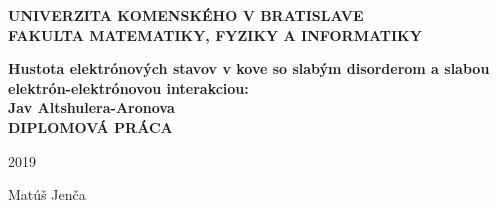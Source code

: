 \thispagestyle{empty}
\begin{center}
{\large \bf UNIVERZITA KOMENSKÉHO V BRATISLAVE \\
FAKULTA MATEMATIKY, FYZIKY A INFORMATIKY}
\end{center}
%

\vspace{2cm}

\vspace{1cm}
\begin{center}
{\large \bf Hustota elektrónových stavov v kove so slabým disorderom a slabou elektrón-elektrónovou interakciou:\\ Jav Altshulera-Aronova\\
\vspace{3cm}
DIPLOMOVÁ PRÁCA}
\end{center}

\vfill
%
\begin{multicols}{2}
{\bf
\begin{flushleft} 2019 \end{flushleft}
\begin{flushright} Matúš Jenča \end{flushright} 
}
\end{multicols}
